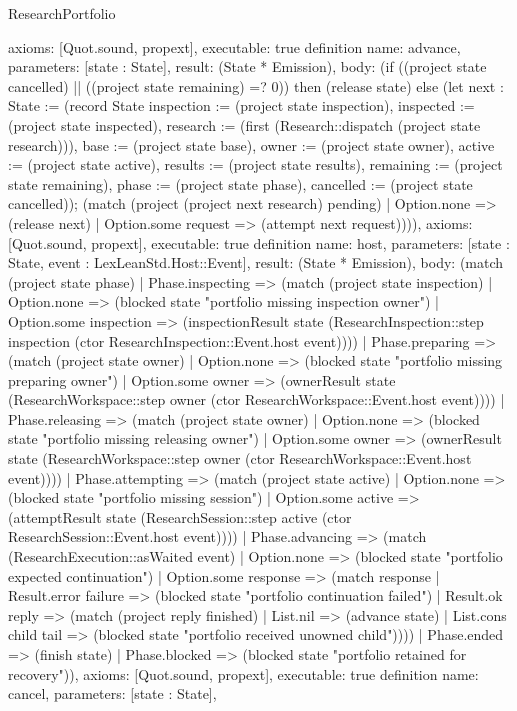 \begin{lexlean}{ResearchPortfolio}
\begin{semanticmodule}
{ axioms: [Quot.sound, propext],
 executable: true
}
definition{
 name: advance,
 parameters: [state : State],
 result: (State * Emission),
 body: (if ((project state cancelled) || ((project state remaining) =? 0)) then (release state) else (let next : State := (record State {inspection := (project state inspection), inspected := (project state inspected), research := (first (Research::dispatch (project state research))), base := (project state base), owner := (project state owner), active := (project state active), results := (project state results), remaining := (project state remaining), phase := (project state phase), cancelled := (project state cancelled)}); (match (project (project next research) pending) | Option.none => (release next) | Option.some request => (attempt next request)))),
 axioms: [Quot.sound, propext],
 executable: true
}
definition{
 name: host,
 parameters: [state : State, event : LexLeanStd.Host::Event],
 result: (State * Emission),
 body: (match (project state phase) | Phase.inspecting => (match (project state inspection) | Option.none => (blocked state "portfolio missing inspection owner") | Option.some inspection => (inspectionResult state (ResearchInspection::step inspection (ctor ResearchInspection::Event.host event)))) | Phase.preparing => (match (project state owner) | Option.none => (blocked state "portfolio missing preparing owner") | Option.some owner => (ownerResult state (ResearchWorkspace::step owner (ctor ResearchWorkspace::Event.host event)))) | Phase.releasing => (match (project state owner) | Option.none => (blocked state "portfolio missing releasing owner") | Option.some owner => (ownerResult state (ResearchWorkspace::step owner (ctor ResearchWorkspace::Event.host event)))) | Phase.attempting => (match (project state active) | Option.none => (blocked state "portfolio missing session") | Option.some active => (attemptResult state (ResearchSession::step active (ctor ResearchSession::Event.host event)))) | Phase.advancing => (match (ResearchExecution::asWaited event) | Option.none => (blocked state "portfolio expected continuation") | Option.some response => (match response | Result.error failure => (blocked state "portfolio continuation failed") | Result.ok reply => (match (project reply finished) | List.nil => (advance state) | List.cons child tail => (blocked state "portfolio received unowned child")))) | Phase.ended => (finish state) | Phase.blocked => (blocked state "portfolio retained for recovery")),
 axioms: [Quot.sound, propext],
 executable: true
}
definition{
 name: cancel,
 parameters: [state : State],
}
\end{semanticmodule}
\end{lexlean}
